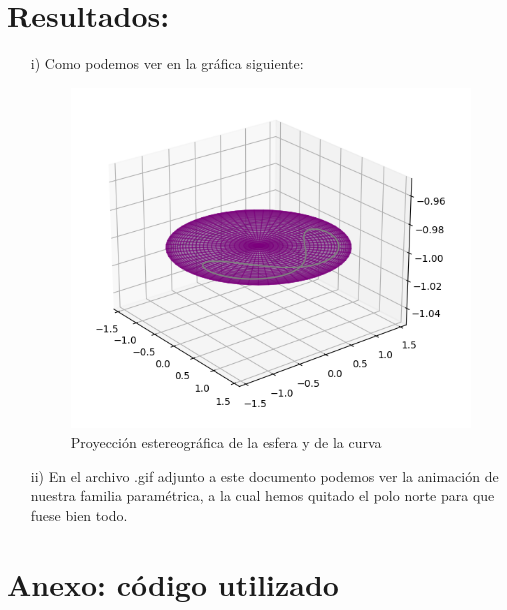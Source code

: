 \documentclass[11pt,a4paper,openright]{article}
\begin{document}
\section{Resultados:}
\begin{enumerate}


\item[i)]Como podemos ver en la gráfica siguiente:\\
\begin{figure}[H]
\centering
\includegraphics[scale=.85]{Proyeccion1.png}
\caption{Proyección estereográfica de la esfera y de la curva}
\end{figure}
\item[ii)] En el archivo .gif adjunto a este documento podemos ver la animación de nuestra familia paramétrica, a la cual hemos quitado el polo norte para que fuese bien todo.
\end{enumerate}
\newpage
\section{Anexo: código utilizado}

\end{document}
